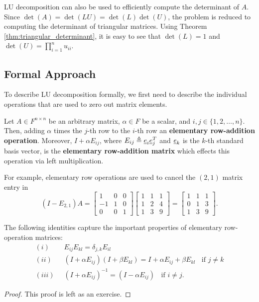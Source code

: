 LU decomposition can also be used to efficiently compute the determinant of $A$.
Since $\det(A) = \det(LU) = \det(L) \det(U)$, the problem is reduced to computing the determinant of triangular matrices.
Using Theorem \ref{thm:triangular_determinant}, it is easy to see that $\det(L) = 1$ and $\det(U) = \prod_{i=1}^n u_{ii}$.

\subsection{Formal Approach}

To describe LU decomposition formally, we first need to describe the individual operations that are used to zero out matrix elements.
\begin{definition}
Let $A \in F^{n\times n}$ be an arbitrary matrix, $\alpha \in F$ be a scalar, and $i,j\in \{1,2,\ldots,n\}$.
Then, adding $\alpha$ times the $j$-th row to the $i$-th row an \textbf{elementary row-addition operation}.
Moreover, $I + \alpha E_{ij}$, where $E_{ij} \triangleq \underline{e}_i \underline{e}_j^T$ and $\underline{e}_k$ is the $k$-th standard basis vector, is the \textbf{elementary row-addition matrix} which effects this operation via left multiplication.
\end{definition}

\begin{example}
For example, elementary row operations are used to cancel the $(2,1)$ matrix entry in
\begin{equation*}
(I - E_{2,1}) A
= \begin{bmatrix} 1 & 0 & 0 \\ -1 & 1 & 0 \\ 0 & 0 & 1 \end{bmatrix}
\begin{bmatrix} 1 & 1 & 1 \\ 1 & 2 & 4 \\ 1 & 3 & 9 \end{bmatrix}
= \begin{bmatrix} 1 & 1 & 1 \\ 0 & 1 & 3 \\ 1 & 3 & 9 \end{bmatrix} .
\end{equation*}
\end{example}

\begin{lemma}
\label{lem:elem_row_mat}
The following identities capture the important properties of elementary row-operation matrices:
\begin{align*}
(i) & \;\; E_{ij} E_{kl} = \delta_{j,k} E_{il} \\
(ii) & \;\; (I + \alpha E_{ij}) (I + \beta E_{kl}) = I + \alpha E_{ij} + \beta E_{kl} \;\; \textrm{ if } j \neq k \\
(iii) & \;\; (I+ \alpha E_{ij})^{-1} = (I-\alpha E_{ij}) \;\; \textrm{ if } i \neq j. 
\end{align*}
\end{lemma}
\begin{proof}
This proof is left as an exercise.
\end{proof}

